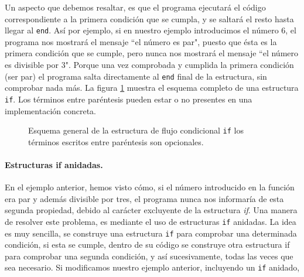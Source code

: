 Un aspecto que debemos resaltar, es que el programa ejecutará el código correspondiente a la primera condición que se cumpla, y se saltará el resto hasta llegar al \texttt{end}. Así por ejemplo, si en nuestro ejemplo introducimos el número $6$, el programa nos mostrará el mensaje ``el número es par", puesto que ésta es la primera condición que se cumple, pero nunca nos mostrará el mensaje ``el número es divisible por 3". Porque una vez comprobada y cumplida la primera condición (ser par) el programa salta directamente al \texttt{end} final de la estructura, sin comprobar nada más. La figura \ref{fig:if} muestra el esquema completo de una estructura \texttt{if}. Los términos entre paréntesis pueden estar o no presentes en una implementación concreta.

\begin{figure}[h]
\centering
{}
\caption{Esquema general de la estructura de flujo condicional \texttt{if} los términos escritos entre paréntesis son opcionales.}
\label{fig:if}
\end{figure} 

\paragraph{Estructuras if anidadas.} 
En el ejemplo anterior, hemos visto cómo, si el número introducido en la función era par y además divisible por tres, el programa nunca nos informaría de esta segunda propiedad, debido al carácter excluyente de la estructura \emph{if}. Una manera de resolver este problema, es mediante el uso de estructuras \texttt{if} anidadas. La idea es muy sencilla, se construye una estructura \texttt{if} para comprobar una determinada condición, si esta se cumple, dentro de su código se construye otra estructura if para comprobar una segunda condición, y así sucesivamente, todas las veces que sea necesario. Si modificamos nuestro ejemplo anterior, incluyendo un \texttt{if} anidado,

